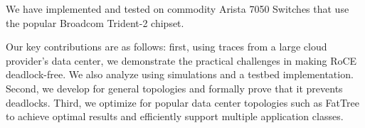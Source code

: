 We have implemented and tested \sysname{} on commodity Arista 7050 Switches that
use the popular Broadcom Trident-2 chipset.

Our key contributions are as follows: first, using traces from a large cloud
provider's data center, we demonstrate the practical challenges in making RoCE
deadlock-free. We also analyze \sysname{} using simulations and a testbed
implementation. Second, we develop \sysname{} for general topologies and
formally prove that it prevents deadlocks. Third, we optimize \sysname{} for
popular data center topologies such as FatTree to achieve optimal results and
efficiently support multiple application classes.  
